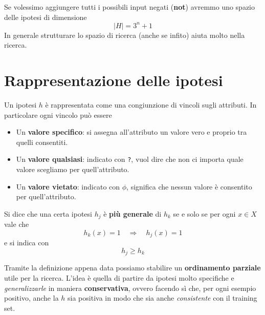 Se volessimo aggiungere tutti i possibili input negati (\textbf{not}) avremmo uno spazio delle ipotesi di dimensione
\[ |H| = 3^n + 1 \]
In generale strutturare lo spazio di ricerca (anche se infito) aiuta molto nella ricerca.

\section{Rappresentazione delle ipotesi}
Un ipotesi $h$ \`e rappresentata come una congiunzione di vincoli sugli attributi. In particolare ogni vincolo pu\`o
essere
\begin{itemize}
	\item Un \textbf{valore specifico}: si assegna all'attributo un valore vero e proprio tra quelli consentiti.
	\item Un \textbf{valore qualsiasi}: indicato con \verb|?|, vuol dire che non ci importa quale valore
	      scegliamo per quell'attributo.
	\item Un \textbf{valore vietato}: indicato con $\phi$, significa che nessun valore \`e consentito per quell'attributo.
\end{itemize}

\begin{definition}
	Si dice che una certa ipotesi $h_j$ \`e \textbf{pi\`u generale} di $h_k$ se e solo se per ogni $x \in X$ vale che
	\[ h_k(x) = 1 \quad \Rightarrow \quad h_j(x) = 1 \]
	e si indica con
	\[ h_j \geq h_k \]
\end{definition}

Tramite la definizione appena data possiamo stabilire un \textbf{ordinamento parziale} utile per la ricerca.
L'idea \`e quella di partire da ipotesi molto specifiche e \emph{generalizzarle} in maniera \textbf{conservativa},
ovvero facendo s\`i che, per ogni esempio positivo, anche la $h$ sia positiva in modo che sia anche \emph{consistente}
con il training set.

